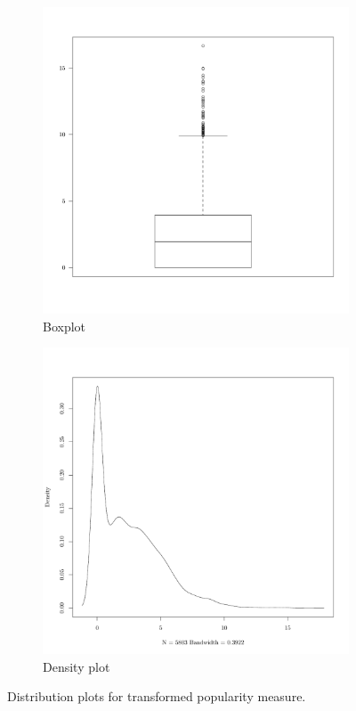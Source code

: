 \begin{figure}[htb]
    \centering
    \begin{subfigure}[b]{0.3\textwidth}
        \includegraphics[width=\textwidth]{figures/popuTransformedBox}
        \caption{Boxplot}
        \label{fig:popuTransformedBox}
    \end{subfigure}
    \quad
    \begin{subfigure}[b]{0.3\textwidth}
        \includegraphics[width=\textwidth]{figures/popuTransformedDensity}
        \caption{Density plot}
        \label{fig:popuTransformedDensity}
    \end{subfigure}
    \caption{Distribution plots for transformed popularity measure.}
\end{figure}

